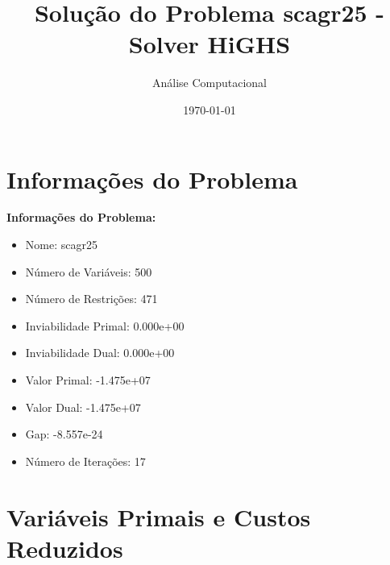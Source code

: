 \documentclass[12pt]{article}
\title{Solução do Problema scagr25 - Solver HiGHS}
\author{Análise Computacional}
\date{\today}
\begin{document}
\maketitle

\section{Informações do Problema}

\textbf{Informações do Problema:}
\begin{itemize}
\item Nome: scagr25
\item Número de Variáveis: 500
\item Número de Restrições: 471
\item Inviabilidade Primal: 0.000e+00
\item Inviabilidade Dual: 0.000e+00
\item Valor Primal: -1.475e+07
\item Valor Dual: -1.475e+07
\item Gap: -8.557e-24
\item Número de Iterações: 17
\end{itemize}


\section{Variáveis Primais e Custos Reduzidos}
\end{document}
